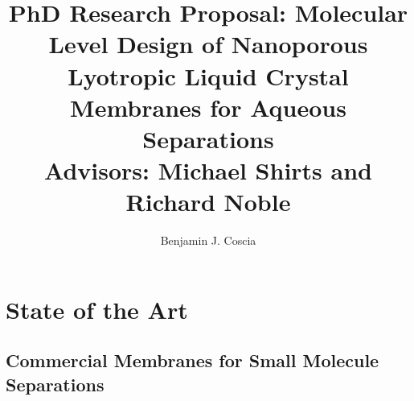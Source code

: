 \documentclass{article}
\title{PhD Research Proposal: Molecular Level Design of Nanoporous Lyotropic Liquid
Crystal Membranes for Aqueous Separations \\ \vspace{0.5cm}
\large Advisors: Michael Shirts and Richard Noble}
\author{Benjamin J. Coscia}
\begin{document}
  \graphicspath{{./figures/}}

  \maketitle
  \thispagestyle{empty}
  \clearpage
  \setcounter{page}{1} %

  \section{State of the Art}\label{section:state-of-the-art}

  \subsection*{Commercial Membranes for Small Molecule Separations}
  
  
  
\end{document}
